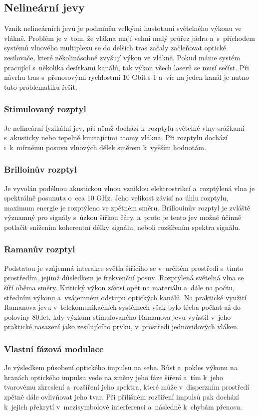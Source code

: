 \subsection{Nelineární jevy}
Vznik nelineárních jevů je podmíněn velkými hustotami světelného výkonu ve vlákně. Problém je v~tom, že vlákna mají velmi malý průřez jádra a~s~příchodem systémů vlnového multiplexu se do delších tras začaly začleňovat optické zesilovače, které několinásobně zvyšují výkon ve vlákně. Pokud máme systém pracující s~několika desítkami kanálů, tak výkon všech laserů se musí sečíst. Při návrhu tras s~přenosovými rychlostmi 10 Gbit.s-1 a~víc na jeden kanál je nutno tuto problematiku řešit.

\subsubsection{Stimulovaný rozptyl}
Je nelineární fyzikální jev, při němž dochází k~rozptylu světelné vlny srážkami s~akusticky nebo tepelně kmitajícími atomy vlákna. Při rozptylu dochází i~k~mírnému posuvu vlnových délek směrem k~vyšším hodnotám.

\subsubsection{Brilloinův rozptyl}
Je vyvolán podélnou akustickou vlnou vzniklou elektrostrikcí a~rozptýlená vlna je spektrálně posunuta o~cca 10 GHz. Jeho velikost závisí na úhlu rozptylu, maximum energie je rozptýleno ve zpětném směru. Brillouinův rozptyl je zvláště významný pro signály s~úzkou šířkou čáry, a~proto je tento jev možné účinně potlačit snížením koherentní délky signálu, neboli rozšířením spektra signálu.

\subsubsection{Ramanův rozptyl}
Podstatou je vzájemná interakce světla šířícího se v~určitém prostředí s~tímto prostředím, jejímž důsledkem je frekvenční posuv. Rozptýlená světelná vlna se šíří oběma směry. Kritický výkon závisí opět na materiálu a~dále na počtu, středním výkonu a~vzájemném odstupu optických kanálů. Na praktické využití Ramanova jevu v~telekomunikačních systémech však bylo třeba počkat až do poloviny 80.let, kdy výzkum stimulovaného Ramanova jevu vyústil v~jeho praktické nasazení jako zesilujícího prvku, v~prostředí jednovidových vláken.

\subsubsection{Vlastní fázová modulace}
Je výsledkem působení optického impulsu na sebe. Růst a~pokles výkonu na hranách optického impulsu vede na změny jeho fáze šíření a~tím k~jeho tvarovému zkreslení a~rozšíření jeho spektra, které může v~disperzním prostředí zpětně dále ovlivňovat jeho tvar. Při přílišném rozšíření impulsů pak dochází k~jejich překrytí v~mezisymbolové interferenci a~následně k~chybám přenosu.

